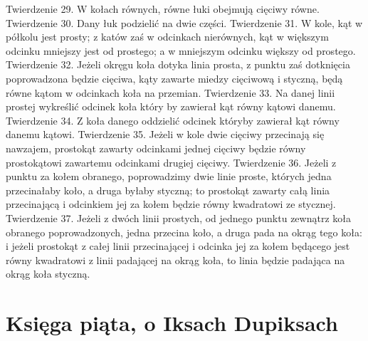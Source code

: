 Twierdzenie 29.
    W kołach równych, równe łuki obejmują cięciwy równe.
Twierdzenie 30.
    Dany łuk podzielić na dwie części.
Twierdzenie 31.
    W kole, kąt w półkolu jest prosty; z katów zaś w odcinkach nierównych, kąt w większym odcinku mniejszy jest od prostego; a w mniejszym odcinku większy od prostego.
Twierdzenie 32.
    Jeżeli okręgu koła dotyka linia prosta, z punktu zaś dotknięcia poprowadzona będzie cięciwa, kąty zawarte miedzy cięciwową i styczną, będą równe kątom w odcinkach koła na przemian.
Twierdzenie 33.
    Na danej linii prostej wykreślić odcinek koła który by zawierał kąt równy kątowi danemu.
Twierdzenie 34.
    Z koła danego oddzielić odcinek któryby zawierał kąt równy danemu kątowi.
Twierdzenie 35.
    Jeżeli w kole dwie cięciwy przecinają się nawzajem, prostokąt zawarty odcinkami jednej cięciwy będzie równy prostokątowi zawartemu odcinkami drugiej cięciwy.
Twierdzenie 36.
    Jeżeli z punktu za kołem obranego, poprowadzimy dwie linie proste, których jedna przecinałaby koło, a druga byłaby styczną; to prostokąt zawarty całą linia przecinającą i odcinkiem jej za kołem będzie równy kwadratowi ze stycznej.
Twierdzenie 37.
    Jeżeli z dwóch linii prostych, od jednego punktu zewnątrz koła obranego poprowadzonych, jedna przecina koło, a druga pada na okrąg tego koła: i jeżeli prostokąt z całej linii przecinającej i odcinka jej za kołem będącego jest równy kwadratowi z linii padającej na okrąg koła, to linia będzie padająca na okrąg koła styczną. 

\section{Księga piąta, o Iksach Dupiksach}

